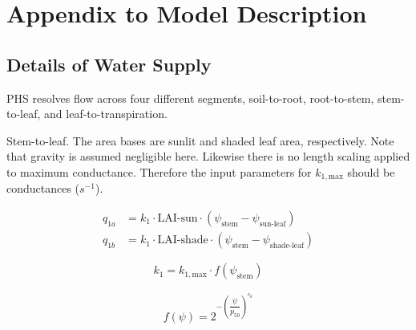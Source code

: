 \documentclass[draft,linenumbers]{agujournal}
\begin{document}
\clearpage

\appendix
\section{Appendix to Model Description}

\subsection{Details of Water Supply}

PHS resolves flow across four different segments, soil-to-root, root-to-stem, stem-to-leaf, and leaf-to-transpiration.

Stem-to-leaf. The area bases are sunlit and shaded leaf area, respectively. 
Note that gravity is assumed negligible here. 
Likewise there is no length scaling applied to maximum conductance. 
Therefore the input parameters for $k_{1,\text{max}}$ should be conductances ($s^{-1}$).

\begin{linenomath*} \begin{equation} \begin{aligned}
q_{1a} &= k_{1} \cdot \text{LAI-sun}  \cdot \left( \psi_{\text{stem}}-\psi_{\text{sun-leaf}}\right) \\
q_{1b} &= k_{1} \cdot \text{LAI-shade} \cdot  \left( \psi_{\text{stem}}-\psi_{\text{shade-leaf}}\right)
\end{aligned} \end{equation} \end{linenomath*}

\begin{linenomath*} \begin{equation}
k_{1} = k_{1,\text{max}} \cdot f\left(\psi_{\text{stem}}\right)
\end{equation} \end{linenomath*}

\begin{linenomath*} \begin{equation} \begin{aligned}
f\left(\psi\right)=2^{-\left(\dfrac{\psi}{p_{50}}\right)^{c_k}}
\end{aligned} \end{equation} \end{linenomath*}
\end{document}
